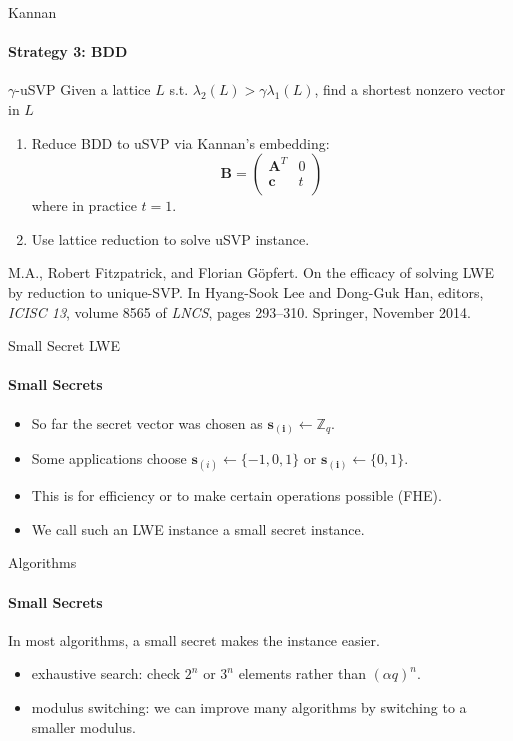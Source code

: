 \documentclass[10pt,compress]{beamer}
\newcommand{\vs}{\vspace{5mm}}
\renewcommand{\vec}[1]{\mathbf{#1}\xspace}
\newcommand{\A}{\vec{A}}
\renewcommand{\vec}[1]{\mathbf{#1}\xspace}
\begin{document}
\begin{frame}{Kannan}
  \framesubtitle{Strategy 3: BDD}

  \begin{alertblock}{$\gamma$-uSVP}
    Given a lattice $L$ s.t. $\lambda_2(L)> \gamma \lambda_1(L)$, find a shortest nonzero vector in $L$
  \end{alertblock}
  
  \vs{}

  \begin{enumerate}
  \item  Reduce BDD to uSVP via Kannan’s embedding:
    \[\vec{B}=\left( 
        \begin{array}{cc}
          \A^T &  0 \\
          \vec{c} & t \\
        \end{array} \right)\] 
    where in practice $t = 1$.
  \item Use lattice reduction to solve uSVP instance.
  \end{enumerate}

  \begin{thebibliography}{99}
    M.A., Robert Fitzpatrick, and Florian G{\"o}pfert.
    \newblock On the efficacy of solving {LWE} by reduction to unique-{SVP}.
    \newblock In Hyang-Sook Lee and Dong-Guk Han, editors, {\em ICISC 13}, volume 8565 of {\em {LNCS}}, pages 293--310. Springer, November 2014.
  \end{thebibliography}

\end{frame}


\begin{frame}{Small Secret LWE}
  \framesubtitle{Small Secrets}
  \begin{itemize}
  \item So far the secret vector was chosen as $\vec{s_{(i)}} \leftarrow \mathbb{Z}_q$. 
  \item Some applications choose $\vec{s}_{(i)} \leftarrow \{-1,0,1\}$ or $\vec{s_{(i)}} \leftarrow \{0,1\}$.
  \item This is for efficiency or to make certain operations possible (FHE).
  \item We call such an LWE instance a \alert{small secret} instance.
  \end{itemize}
\end{frame}


\begin{frame}{Algorithms}
  \framesubtitle{Small Secrets}
  In most algorithms, a small secret makes the instance easier. 
  \begin{itemize}
  \item \alert{exhaustive search}: check $2^n$ or $3^n$ elements rather than ${(\alpha q)}^{n}$.
  \item \alert{modulus switching}: we can improve many algorithms by switching to a smaller modulus.
  \end{itemize}
\end{frame}
\end{document}
